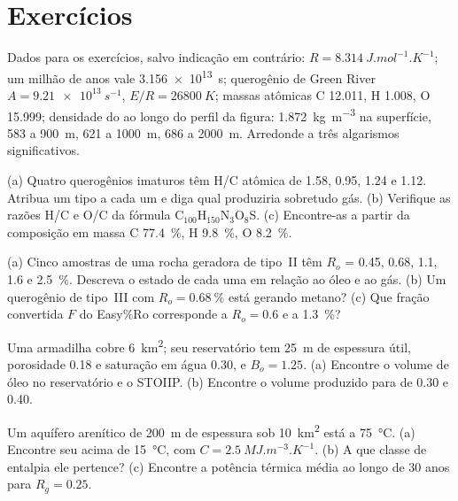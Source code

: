 \section*{Exercícios}\label{sec:b2:energy-geology:exercises}

Dados para os exercícios, salvo indicação em contrário: $R = \qty{8.314}{J.mol^{-1}.K^{-1}}$; um milhão
de anos vale \qty{3.156e13}{s}; querogênio de Green River $A = \qty{9.21e13}{s^{-1}}$, $E/R = \qty{26800}{K}$;
massas atômicas C 12.011, H 1.008, O 15.999; densidade do  ao longo do perfil da figura:
\qty{1.872}{kg.m^{-3}} na superfície, 583 a \qty{900}{m}, 621 a \qty{1000}{m}, 686 a
\qty{2000}{m}. Arredonde a três algarismos significativos.

\begin{exercise}[$\star$]\label{exo:b2:energy-geology:1}
(a) Quatro querogênios imaturos têm H/C atômica de 1.58, 0.95, 1.24 e 1.12. Atribua um tipo a cada um e diga
qual produziria sobretudo gás. (b) Verifique as razões H/C e O/C da fórmula
C$_{100}$H$_{150}$N$_3$O$_8$S. (c) Encontre-as a partir da composição em massa C \qty{77.4}{\percent}, H
\qty{9.8}{\percent}, O \qty{8.2}{\percent}.
\end{exercise}

\begin{exercise}[$\star$]\label{exo:b2:energy-geology:2}
(a) Cinco amostras de uma rocha geradora de tipo~II têm $R_o$ = 0.45, 0.68, 1.1, 1.6 e \qty{2.5}{\percent}.
Descreva o estado de cada uma em relação ao óleo e ao gás. (b) Um querogênio de tipo~III com $R_o =
\qty{0.68}{\percent}$ está gerando metano? (c) Que fração convertida $F$ do Easy\%Ro corresponde a
$R_o = 0.6$ e a \qty{1.3}{\percent}?
\end{exercise}

\begin{exercise}[$\star$]\label{exo:b2:energy-geology:3}
Uma armadilha cobre \qty{6}{km^2}; seu reservatório tem \qty{25}{m} de espessura útil, porosidade 0.18 e saturação
em água 0.30, e $B_o = 1.25$. (a) Encontre o volume de óleo no reservatório e o STOIIP. (b) Encontre
o volume produzido para  de 0.30 e 0.40.
\end{exercise}

\begin{exercise}[$\star$]\label{exo:b2:energy-geology:4}
Um aquífero arenítico de \qty{200}{m} de espessura sob \qty{10}{km^2} está a \qty{75}{\celsius}. (a) Encontre seu
 acima de \qty{15}{\celsius}, com $C = \qty{2.5}{MJ.m^{-3}.K^{-1}}$. (b) A que
classe de entalpia ele pertence? (c) Encontre a potência térmica média ao longo de 30 anos para $R_g = 0.25$.
\end{exercise}

